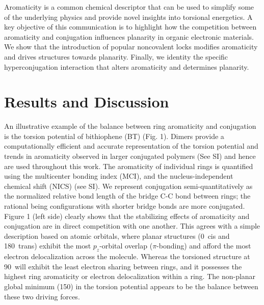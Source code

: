 Aromaticity is a common chemical descriptor that can be used to simplify some of the underlying physics and provide novel insights into torsional energetics. A key objective of this communication is to highlight how the competition between aromaticity and conjugation\cite{Hernandez1994, Kertesz2005, Huang2017} influences planarity in organic electronic materials. We show that the introduction of popular noncovalent locks modifies aromaticity and drives structures towards planarity. Finally, we identity the specific hyperconjugation interaction that alters aromaticity and determines planarity.

\section{Results and Discussion}

An illustrative example of the balance between ring aromaticity and conjugation is the torsion potential of bithiophene (BT) (Fig. 1). Dimers provide a computationally efficient and accurate representation of the torsion potential and trends in aromaticity observed in larger conjugated polymers (See SI)\cite{Dubay2012} and hence are used throughout this work. The aromaticity of individual rings is quantified using the multicenter bonding index (MCI),\cite{Giambiagi1990, Giambiagi2000} and the nucleus-independent chemical shift (NICS)\cite{Fallah-Bagher-Shaidaei2006, Chen2005} (see SI). We represent conjugation semi-quantitatively as the normalized relative bond length of the bridge C-C bond between rings; the rational being configurations with shorter bridge bonds are more conjugated.\cite{Daudey1980, Fernandez2006} Figure 1 (left side) clearly shows that the stabilizing effects of aromaticity and conjugation are in direct competition with one another. This agrees with a simple description based on atomic orbitals, where planar structures (0\textdegree \ cis and 180\textdegree \ trans) exhibit the most $p_z$-orbital overlap ($\pi$-bonding) and afford the most electron delocalization across the molecule. Whereas the torsioned structure at 90\textdegree \ will exhibit the least electron sharing between rings, and it possesses the highest ring aromaticity or electron delocalization within a ring. The non-planar global minimum (150\textdegree) in the torsion potential appears to be the balance between these two driving forces.


